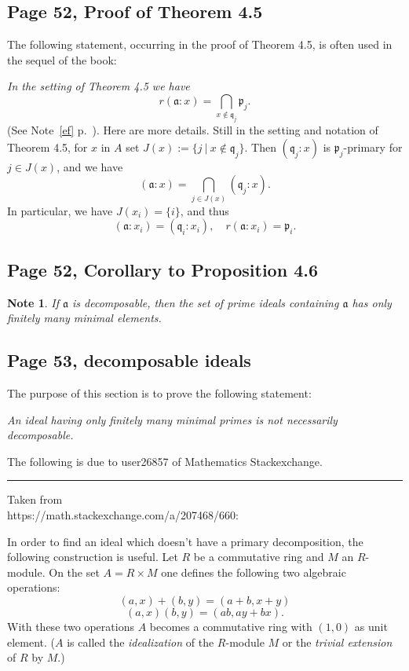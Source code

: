 \documentclass[parskip=half,fontsize=12pt]{scrartcl}%
\newcommand{\mf}{\mathfrak}
\newcommand{\ppp}{\mf p}
\newtheorem{note}[thm]{Note}
\begin{document}
\subsection{Page 52, Proof of Theorem 4.5}%

The following statement, occurring in the proof of Theorem 4.5, is often used in the sequel of the book:

{\em In the setting of Theorem 4.5 we have} 
\begin{equation}\label{45}
r(\mf a:x)=\bigcap_{x\notin\mf q_j}\ppp_j.
\end{equation}
(See Note~\ref{ef} p.~\pageref{ef}). Here are more details. Still in the setting and notation of Theorem 4.5, for $x$ in $A$ set $J(x):=\{j\ |\ x\notin\mf q_j\}$. Then $(\mf q_j:x)$ is $\ppp_j$-primary for $j\in J(x)$, and we have 
$$
(\mf a:x)=\bigcap_{j\in J(x)}(\mf q_j:x).
$$ 
In particular, we have $J(x_i)=\{i\}$, and thus 
$$
(\mf a:x_i)=(\mf q_i:x_i),\quad r(\mf a:x_i)=\ppp_i.
$$

\subsection{Page 52, Corollary to Proposition 4.6}%

\begin{note}\label{fmme}
If $\mf a$ is decomposable, then the set of prime ideals containing $\mf a$ has only finitely many minimal elements.
\end{note}

\subsection{Page 53, decomposable ideals}\label{di}%

The purpose of this section is to prove the following statement:

\emph{An ideal having only finitely many minimal primes is not necessarily decomposable.}

The following is due to user26857 of Mathematics Stackexchange.\bigskip\bigskip

\hrule\bigskip

Taken from\\ https://math.stackexchange.com/a/207468/660:

In order to find an ideal which doesn't have a primary decomposition, the following construction is useful. Let $R$ be a commutative ring and $M$ an $R$-module. On the set $A=R\times M$ one defines the following two algebraic operations:
$$
(a,x)+(b,y)=(a+b,x+y)
$$
$$
(a,x)(b,y)=(ab,ay+bx).
$$
With these two operations $A$ becomes a commutative ring with $(1,0)$ as unit element. ($A$
is called the \emph{idealization} of the $R$-module $M$ or the \emph{trivial extension} of $R$ by $M$.)
\end{document}
